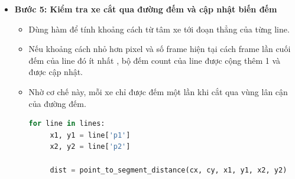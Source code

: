 \begin{itemize}
\begin{itemize}
\begin{itemize}[label={+}]
                         \item Chiều rộng và chiều cao bounding box đều lớn hơn 15 pixel.
                         \item Tỉ lệ khung hình $\dfrac{w}{h}$ nằm trong $[0.4, 3.0]$.
                    \end{itemize}
                    \item Các contour thỏa điều kiện được coi là xe, được vẽ bounding box màu xanh lá và tâm xe là điểm giữa của bounding box.
                    \begin{lstlisting}[language=Python]
contours, _ = cv2.findContours(fgMask, cv2.RETR_EXTERNAL,
                              cv2.CHAIN_APPROX_SIMPLE)

for cnt in contours:
     if not is_valid_blob(cnt):
          continue
     x, y, w_box, h_box = cv2.boundingRect(cnt)
     cx = x + w_box // 2
     cy = y + h_box // 2
                    \end{lstlisting}
               \end{itemize}
               \item \textbf{Bước 5: Kiểm tra xe cắt qua đường đếm và cập nhật biến đếm}
               \begin{itemize}[label={--}]
                    \item Dùng hàm  để tính khoảng cách từ tâm xe tới đoạn thẳng của từng line.
                    \item Nếu khoảng cách nhỏ hơn  pixel và số frame hiện tại cách frame lần cuối đếm của line đó ít nhất , bộ đếm count của line được cộng thêm 1 và  được cập nhật.
                    \item Nhờ cơ chế này, mỗi xe chỉ được đếm một lần khi cắt qua vùng lân cận của đường đếm.
                    \begin{lstlisting}[language=Python]
 for line in lines:
     x1, y1 = line['p1']
     x2, y2 = line['p2']

     dist = point_to_segment_distance(cx, cy, x1, y1, x2, y2)


\end{lstlisting}
\end{itemize}
\end{itemize}
